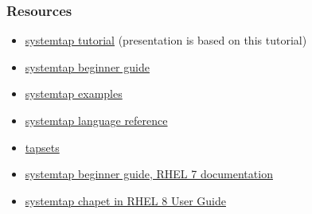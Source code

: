 \documentclass[10pt,utf8]{beamer}
\begin{document}
\begin{frame}
	\frametitle{Resources}
	\begin{itemize}
		\item \color{blue}\href{http://sourceware.org/systemtap/tutorial.pdf}{systemtap tutorial} \color{black}(presentation is based on this tutorial)
		\item \color{blue}\href{https://sourceware.org/systemtap/SystemTap_Beginners_Guide/}{systemtap beginner guide}
		\item \href{https://sourceware.org/systemtap/examples/}{systemtap examples}
		\item \href{https://sourceware.org/systemtap/langref/}{systemtap language reference}
		\item \href{https://sourceware.org/systemtap/tapsets/}{tapsets}
		\item \href{https://access.redhat.com/documentation/en-us/red\_hat\_enterprise_linux/7/html-single/systemtap\_beginners\_guide/index}{systemtap beginner guide, RHEL 7 documentation}
		\item \href{https://access.redhat.com/documentation/en-us/red_hat_developer\_toolset/8/html/user\_guide/chap-systemtap}{systemtap chapet in RHEL 8 User Guide}
	\end{itemize}
\end{frame}
\end{document}
